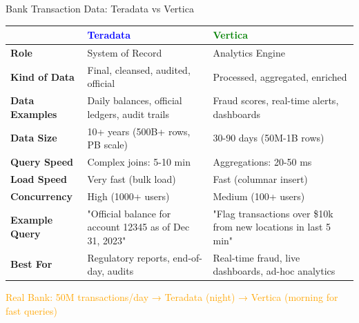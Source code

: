 \documentclass{beamer}
\begin{document}
\begin{frame}{Bank Transaction Data: Teradata vs Vertica}
	\tiny
	\begin{center}
		\begin{tabular}{|p{}|p{}|p{}|}
			\hline
			& \textcolor{blue}{\textbf{Teradata}} & \textcolor{green}{\textbf{Vertica}} \\
			\hline
			\textbf{Role} & System of Record & Analytics Engine \\
			\hline
			\textbf{Kind of Data} & Final, cleansed, audited, official & Processed, aggregated, enriched \\
			\hline
			\textbf{Data Examples} & Daily balances, official ledgers, audit trails & Fraud scores, real-time alerts, dashboards \\
			\hline
			\textbf{Data Size} & 10+ years (500B+ rows, PB scale) & 30-90 days (50M-1B rows) \\
			\hline
			\textbf{Query Speed} & Complex joins: 5-10 min & Aggregations: 20-50 ms \\
			\hline
			\textbf{Load Speed} & Very fast (bulk load) & Fast (columnar insert) \\
			\hline
			\textbf{Concurrency} & High (1000+ users) & Medium (100+ users) \\
			\hline
			\textbf{Example Query} & "Official balance for account 12345 as of Dec 31, 2023" & "Flag transactions over \$10k from new locations in last 5 min" \\
			\hline
			\textbf{Best For} & Regulatory reports, end-of-day, audits & Real-time fraud, live dashboards, ad-hoc analytics \\
			\hline
		\end{tabular}
	\end{center}
	
	\vspace{0.15cm}
	\begin{center}
		\textcolor{orange}{\scriptsize Real Bank: 50M transactions/day → Teradata (night) → Vertica (morning for fast queries)}
	\end{center}
\end{frame}
\end{document}
